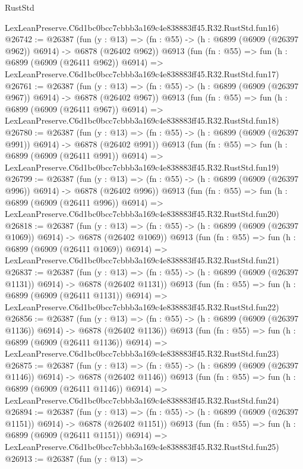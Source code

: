 \begin{lexlean}{RustStd}
\begin{coremodule}
    LexLeanPreserve.C6d1bc0bcc7cbbb3a169c4e838883ff45.R32.RustStd.fun16)
@26742 := @26387
    (fun (y : @13) => (fn : @55) -> (h : @6899 (@6909 (@26397 @962)) @6914) -> @6878 (@26402 @962))
    @6913
    (fun (fn : @55) =>
    fun (h : @6899 (@6909 (@26411 @962)) @6914) =>
    LexLeanPreserve.C6d1bc0bcc7cbbb3a169c4e838883ff45.R32.RustStd.fun17)
@26761 := @26387
    (fun (y : @13) => (fn : @55) -> (h : @6899 (@6909 (@26397 @967)) @6914) -> @6878 (@26402 @967))
    @6913
    (fun (fn : @55) =>
    fun (h : @6899 (@6909 (@26411 @967)) @6914) =>
    LexLeanPreserve.C6d1bc0bcc7cbbb3a169c4e838883ff45.R32.RustStd.fun18)
@26780 := @26387
    (fun (y : @13) => (fn : @55) -> (h : @6899 (@6909 (@26397 @991)) @6914) -> @6878 (@26402 @991))
    @6913
    (fun (fn : @55) =>
    fun (h : @6899 (@6909 (@26411 @991)) @6914) =>
    LexLeanPreserve.C6d1bc0bcc7cbbb3a169c4e838883ff45.R32.RustStd.fun19)
@26799 := @26387
    (fun (y : @13) => (fn : @55) -> (h : @6899 (@6909 (@26397 @996)) @6914) -> @6878 (@26402 @996))
    @6913
    (fun (fn : @55) =>
    fun (h : @6899 (@6909 (@26411 @996)) @6914) =>
    LexLeanPreserve.C6d1bc0bcc7cbbb3a169c4e838883ff45.R32.RustStd.fun20)
@26818 := @26387
    (fun (y : @13) =>
    (fn : @55) -> (h : @6899 (@6909 (@26397 @1069)) @6914) -> @6878 (@26402 @1069))
    @6913
    (fun (fn : @55) =>
    fun (h : @6899 (@6909 (@26411 @1069)) @6914) =>
    LexLeanPreserve.C6d1bc0bcc7cbbb3a169c4e838883ff45.R32.RustStd.fun21)
@26837 := @26387
    (fun (y : @13) =>
    (fn : @55) -> (h : @6899 (@6909 (@26397 @1131)) @6914) -> @6878 (@26402 @1131))
    @6913
    (fun (fn : @55) =>
    fun (h : @6899 (@6909 (@26411 @1131)) @6914) =>
    LexLeanPreserve.C6d1bc0bcc7cbbb3a169c4e838883ff45.R32.RustStd.fun22)
@26856 := @26387
    (fun (y : @13) =>
    (fn : @55) -> (h : @6899 (@6909 (@26397 @1136)) @6914) -> @6878 (@26402 @1136))
    @6913
    (fun (fn : @55) =>
    fun (h : @6899 (@6909 (@26411 @1136)) @6914) =>
    LexLeanPreserve.C6d1bc0bcc7cbbb3a169c4e838883ff45.R32.RustStd.fun23)
@26875 := @26387
    (fun (y : @13) =>
    (fn : @55) -> (h : @6899 (@6909 (@26397 @1146)) @6914) -> @6878 (@26402 @1146))
    @6913
    (fun (fn : @55) =>
    fun (h : @6899 (@6909 (@26411 @1146)) @6914) =>
    LexLeanPreserve.C6d1bc0bcc7cbbb3a169c4e838883ff45.R32.RustStd.fun24)
@26894 := @26387
    (fun (y : @13) =>
    (fn : @55) -> (h : @6899 (@6909 (@26397 @1151)) @6914) -> @6878 (@26402 @1151))
    @6913
    (fun (fn : @55) =>
    fun (h : @6899 (@6909 (@26411 @1151)) @6914) =>
    LexLeanPreserve.C6d1bc0bcc7cbbb3a169c4e838883ff45.R32.RustStd.fun25)
@26913 := @26387
    (fun (y : @13) =>

\end{coremodule}
\end{lexlean}
